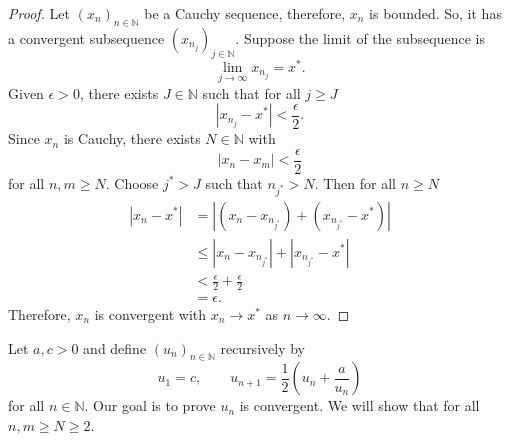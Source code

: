 \begin{proof}
    Let $(x_n)_{n\in\mathbb N}$ be a Cauchy sequence, therefore, $x_n$ is bounded. So, it has a convergent subsequence $(x_{n_j})_{j\in\mathbb N}$. Suppose the limit of the subsequence is \[\lim_{j\to\infty}x_{n_j}=x^*.\] Given $\epsilon>0$, there exists $J\in\mathbb N$ such that for all $j\geq J$ \[|x_{n_j}-x^*|<\frac\epsilon2.\] Since $x_n$ is Cauchy, there exists $N\in\mathbb N$ with \[|x_n-x_m|<\frac\epsilon2\] for all $n,m\geq N$. Choose $j^*>J$ such that $n_{j^*}>N$. Then for all $n\geq N$
    \begin{align*}
        |x_n-x^*|&=|(x_n-x_{n_{j^*}})+(x_{n_{j^*}}-x^*)|\\
        &\leq |x_n-x_{n_{j^*}}|+|x_{n_{j^*}}-x^*|\\
        &<\frac\epsilon2+\frac\epsilon2\\
        &=\epsilon.
    \end{align*}
    Therefore, $x_n$ is convergent with $x_n\to x^*$ as $n\to\infty$.
\end{proof}

\begin{example}
    Let $a,c>0$ and define $(u_n)_{n\in\mathbb N}$ recursively by \[u_1=c,\qquad u_{n+1}=\frac12\left(u_n+\frac a{u_n}\right)\] for all $n\in\mathbb N$. Our goal is to prove $u_n$ is convergent. We will show that for all $n,m\geq N\geq 2$.
\end{example}




